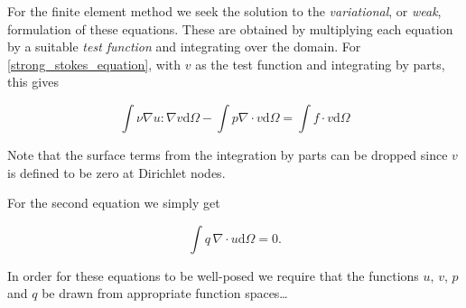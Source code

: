 \documentclass[thesis]{subfiles}
\begin{document}
For the finite element method we seek the solution to the \textit{variational}, or \textit{weak}, formulation of these equations.
These are obtained by multiplying each equation by a suitable \textit{test function} and integrating over the domain.
For \ref{strong_stokes_equation}, with $v$ as the test function and integrating by parts, this gives

\begin{equation}
  \int \nu \nabla u : \nabla v \textrm{d}\Omega
  - \int p \nabla \cdot v \textrm{d}\Omega
  = \int f \cdot v \textrm{d}\Omega
\end{equation}

Note that the surface terms from the integration by parts can be dropped since $v$ is defined to be zero at Dirichlet nodes.

For the second equation we simply get

\begin{equation}
  \int q \, \nabla \cdot u \textrm{d}\Omega = 0.
\end{equation}

In order for these equations to be well-posed we require that the functions $u$, $v$, $p$ and $q$ be drawn from appropriate function spaces\dots





\end{document}
